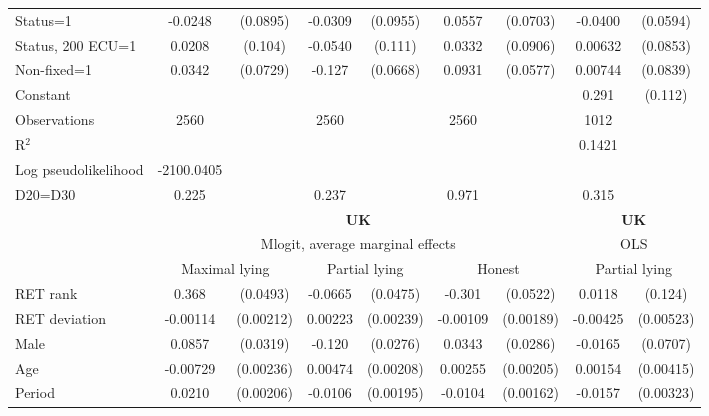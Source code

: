 \begin{tabular}{l|cccccc|cc}
Status=1        &  -0.0248         & (0.0895)&  -0.0309         & (0.0955)&   0.0557         & (0.0703)&  -0.0400         & (0.0594)\\
Status, 200 ECU=1&   0.0208         &  (0.104)&  -0.0540         &  (0.111)&   0.0332         & (0.0906)&  0.00632         & (0.0853)\\
Non-fixed=1     &   0.0342         & (0.0729)&   -0.127\sym{*}  & (0.0668)&   0.0931         & (0.0577)&  0.00744         & (0.0839)\\
Constant        &                  &         &                  &         &                  &         &    0.291\sym{**} &  (0.112)\\
\hline
Observations    &     2560         &         &     2560         &         &     2560         &         &     1012         &         \\
R$^2$      &                  &         &                  &         &                  &         &       0.1421   &   \\ 
Log pseudolikelihood  &  -2100.0405   &         &                  &         &                  &         &           &   \\ 
D20=D30         &    0.225         &         &    0.237         &         &    0.971         &         &    0.315         &         \\
\hline\hline
&\multicolumn{6}{c|}{\bf UK}&\multicolumn{2}{c}{\bf UK}\\ &\multicolumn{6}{c|}{Mlogit, average marginal effects }&\multicolumn{2}{c}{OLS}\\
                &\multicolumn{2}{c}{Maximal lying}&\multicolumn{2}{c}{Partial lying}&\multicolumn{2}{c}{Honest}  &\multicolumn{2}{c}{Partial lying}\\
\hline
RET rank        &    0.368\sym{***}& (0.0493)&  -0.0665         & (0.0475)&   -0.301\sym{***}& (0.0522)&   0.0118         &  (0.124)\\
RET deviation   & -0.00114         &(0.00212)&  0.00223         &(0.00239)& -0.00109         &(0.00189)& -0.00425         &(0.00523)\\
Male            &   0.0857\sym{***}& (0.0319)&   -0.120\sym{***}& (0.0276)&   0.0343         & (0.0286)&  -0.0165         & (0.0707)\\
Age             & -0.00729\sym{***}&(0.00236)&  0.00474\sym{**} &(0.00208)&  0.00255         &(0.00205)&  0.00154         &(0.00415)\\
Period          &   0.0210\sym{***}&(0.00206)&  -0.0106\sym{***}&(0.00195)&  -0.0104\sym{***}&(0.00162)&  -0.0157\sym{***}&(0.00323)\\

\end{tabular}
